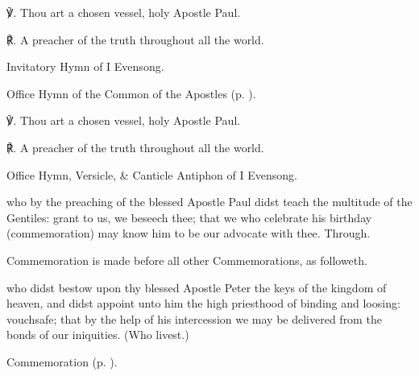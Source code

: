 ℣. Thou art a chosen vessel, holy Apostle Paul.

℟. A preacher of the truth throughout all the world.


\clearpage
\mattins
{}

\begin{rubric}
	Invitatory Hymn of I Evensong.
\end{rubric}

\begin{rubric}
	Office Hymn of the Common of the Apostles (p. \pageref{CommonApostles}).
\end{rubric}

℣. Thou art a chosen vessel, holy Apostle Paul.

℟. A preacher of the truth throughout all the world.


\secondEvensong
{}

\begin{rubric}
	Office Hymn, Versicle, \& Canticle Antiphon of I Evensong.
\end{rubric}

\collect
{} who by the preaching of the blessed Apostle Paul didst teach the multitude of the Gentiles: grant to us, we beseech thee; that we who celebrate his birthday (commemoration) may know him to be our advocate with thee. Through.

\begin{rubric}
	Commemoration  is made before all other Commemorations, as followeth.
\end{rubric}

 who didst bestow upon thy blessed Apostle Peter the keys of the kingdom of heaven, and didst  appoint unto him the high priesthood of binding and loosing: vouchsafe; that by the help of his intercession we may be delivered from the bonds of our iniquities. (Who livest.)

\begin{rubric}
	Commemoration  (p. \pageref{JohnBaptistCollect}).
\end{rubric}


